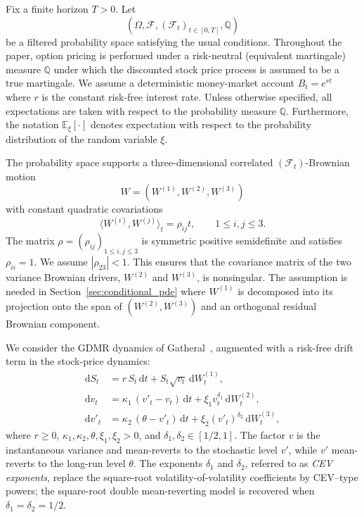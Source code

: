 \documentclass[pdflatex,sn-mathphys-num]{sn-jnl}
\theoremstyle{thmstyleone}%
\theoremstyle{thmstylethree}%
\theoremstyle{thmstyletwo}%
\newcommand{\dd}{\mathrm d}
\newcommand{\E}{\mathbb E}
\newcommand{\Q}{\mathbb Q}
\newcommand{\F}{\mathcal F}
\begin{document}
Fix a finite horizon $T>0$. Let
$$
(\Omega,\F,(\F_t)_{t\in[0,T]},\Q)
$$
be a filtered probability space satisfying the usual conditions.  Throughout the paper, option pricing is performed under a risk-neutral (equivalent martingale) measure $\Q$ under which the discounted stock price process is assumed to be a true martingale. We assume a deterministic money-market account $B_t=e^{rt}$ where $r$ is the constant risk-free interest rate. Unless otherwise specified, all expectations are taken with respect to the probability measure $\Q$. Furthermore, the notation $\E_\xi[\cdot]$ denotes expectation with respect to the probability distribution of the random variable $\xi$.

The probability space supports a three-dimensional correlated $(\F_t)$-Brownian motion
$$
W=(W^{(1)},W^{(2)},W^{(3)})
$$
with constant quadratic covariations
$$
\langle W^{(i)},W^{(j)}\rangle_t=\rho_{ij}t,\qquad 1\le i,j\le 3.
$$
The matrix $\rho=(\rho_{ij})_{1\le i,j\le 3}$ is symmetric positive
semidefinite and satisfies $\rho_{ii}=1$. We assume $|\rho_{23}|<1$. This ensures that the covariance matrix of the two variance
Brownian drivers, $W^{(2)}$ and $W^{(3)}$, is nonsingular. The assumption is needed in Section~\ref{sec:conditional_pde} where $W^{(1)}$ is decomposed into its projection onto the span of
$(W^{(2)},W^{(3)})$ and an orthogonal residual Brownian component.

We consider the GDMR dynamics of Gatheral~\cite{gatheral2008}, augmented with a risk-free drift term in the stock-price dynamics:
\begin{equation}\label{eq:gdmr}
\begin{aligned}
\dd S_t &= r\,S_t\,\dd t + S_t\sqrt{v_t}\,\dd W^{(1)}_t,\\
\dd v_t &= \kappa_1\,(v'_t - v_t)\,\dd t + \xi_1 v_t^{\delta_1}\,\dd W^{(2)}_t,\\
\dd v'_t &= \kappa_2\,(\theta - v'_t)\,\dd t + \xi_2 (v'_t)^{\delta_2}\,\dd W^{(3)}_t,
\end{aligned}
\end{equation}
where $r\ge0$, $\kappa_1,\kappa_2,\theta,\xi_1,\xi_2>0$, and
$\delta_1,\delta_2\in[1/2,1]$. The factor $v$ is the instantaneous variance and
mean-reverts to the stochastic level $v'$, while $v'$ mean-reverts to the
long-run level $\theta$. The exponents $\delta_1$ and $\delta_2$, referred to as \emph{CEV exponents}, replace the
square-root volatility-of-volatility coefficients by CEV--type powers; the
square-root double mean-reverting model is recovered when
$\delta_1=\delta_2=1/2$.
\end{document}

